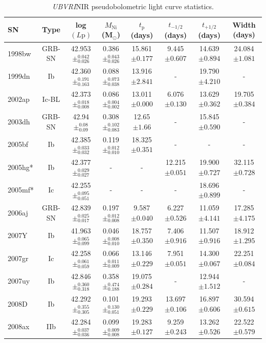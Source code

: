 \documentclass[a4paper,fleqn,usenatbib]{mnras}
\begin{document}
\begin{table}
\renewcommand{\arraystretch}{1.5}
 \centering
 \begin{minipage}{160mm}
  \caption{\textit{UBVRI}NIR pseudobolometric light curve statistics.}
 \begin{tabular}{lccccccc}
  \hline
  SN & Type & log$(L{\mathrm{p}})$ &$M_{\mathrm{Ni}}$ (M$_{\odot}$) &$t_{\mathrm{p}}$ (days) & $t_{-1/2}$ (days) & $t_{+1/2}$ (days) & Width (days)  \\
  \hline
1998bw & GRB-SN & 42.953$\pm^{0.042}_{0.026}$ & 0.386$\pm^{0.043}_{0.026}$ & 15.861$\pm{0.177}$ & 9.445$\pm 0.607$ & 14.639$\pm 0.894$ & 24.084$\pm 1.081$\\
1999dn & Ib & 42.360$\pm^{0.191}_{0.163}$ & 0.088$\pm^{0.073}_{0.038}$ & 13.916$\pm{2.841}$ & - & 19.790$\pm 4.210$ & -\\
2002ap & Ic-BL & 42.373$\pm^{0.018}_{0.008}$ & 0.086$\pm^{0.004}_{0.002}$ & 13.011$\pm{0.000}$ & 6.076$\pm 0.130$ & 13.629$\pm 0.362$ & 19.705$\pm 0.384$\\
2003dh & GRB-SN & 42.94$\pm^{0.08}_{0.09}$ & 0.308$\pm^{0.102}_{0.083}$ & 12.65$\pm{1.66}$ & - & 15.845$\pm 0.590$ & -\\
2005bf & Ib & 42.385$\pm^{0.033}_{0.032}$ & 0.119$\pm^{0.012}_{0.010}$ & 18.325$\pm{0.351}$ & - & - & -\\
2005hg* & Ib & 42.377$\pm^{0.029}_{0.027}$ & - & - & 12.215$\pm 0.051$ & 19.900$\pm 0.727$ & 32.115$\pm 0.728$\\
2005mf* & Ic & 42.255$\pm^{0.095}_{0.051}$ & - & - & - & 18.696$\pm 0.899$ & -\\
2006aj & GRB-SN & 42.839$\pm^{0.025}_{0.017}$ & 0.197$\pm^{0.012}_{0.008}$ & 9.587$\pm{0.040}$ & 6.227$\pm 0.526$ & 11.059$\pm 4.141$ & 17.285$\pm 4.175$\\
2007Y & Ib & 41.963$\pm^{0.065}_{0.099}$ & 0.046$\pm^{0.008}_{0.010}$ & 18.757$\pm{0.350}$ & 7.406$\pm 0.916$ & 11.507$\pm 0.916$ & 18.912$\pm 1.295$\\
2007gr & Ic & 42.258$\pm^{0.061}_{0.059}$ & 0.066$\pm^{0.011}_{0.009}$ & 13.146$\pm{0.229}$ & 7.951$\pm 0.051$ & 14.300$\pm 0.067$ & 22.251$\pm 0.084$\\
2007uy & Ib & 42.846$\pm^{0.360}_{0.318}$ & 0.358$\pm^{0.474}_{0.188}$ & 19.075$\pm{0.284}$ & - & 12.944$\pm 1.512$ & -\\
2008D & Ib & 42.292$\pm^{0.355}_{0.305}$ & 0.101$\pm^{0.130}_{0.051}$ & 19.293$\pm{0.229}$ & 13.697$\pm 0.106$ & 16.897$\pm 0.606$ & 30.594$\pm 0.615$\\
2008ax & IIb & 42.284$\pm^{0.037}_{0.036}$ & 0.099$\pm^{0.009}_{0.008}$ & 19.283$\pm{0.127}$ & 9.259$\pm 0.243$ & 13.262$\pm 0.526$ & 22.522$\pm 0.579$\\

\end{tabular}
\end{minipage}
\end{table}
\end{document}
